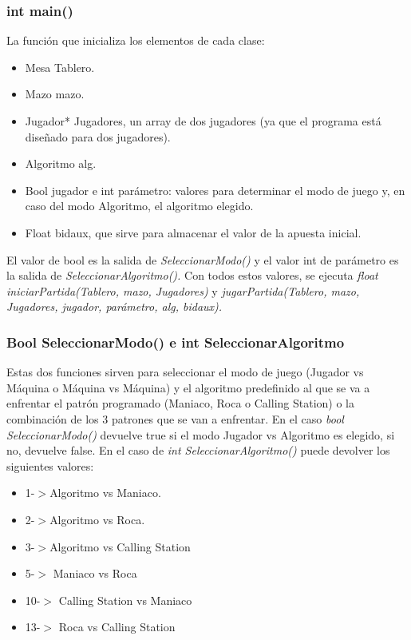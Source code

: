 \subsubsection{int main()}

La función que inicializa los elementos de cada clase:
\begin{itemize}
\item Mesa Tablero.
\item Mazo mazo.
\item Jugador* Jugadores, un array de dos jugadores (ya que el programa está diseñado para dos jugadores).
\item Algoritmo alg.
\item Bool jugador e int parámetro: valores para determinar el modo de juego y, en caso del modo Algoritmo, el algoritmo elegido.
\item Float bidaux, que sirve para almacenar el valor de la apuesta inicial.
 \end{itemize}
El valor de bool es la salida de \textit{SeleccionarModo()} y el valor int de parámetro es la salida de \textit{SeleccionarAlgoritmo().}
Con todos estos valores, se ejecuta \textit{float iniciarPartida(Tablero, mazo, Jugadores)} y \textit{jugarPartida(Tablero, mazo, Jugadores, jugador, parámetro, alg, bidaux).}

\subsubsection{Bool SeleccionarModo() e int SeleccionarAlgoritmo}
Estas dos funciones sirven para seleccionar el modo de juego (Jugador vs Máquina o Máquina vs Máquina) y el algoritmo predefinido al que se va a enfrentar el patrón programado (Maniaco, Roca o Calling Station) o la combinación de los 3 patrones que se van a enfrentar.
En el caso \textit{bool SeleccionarModo()} devuelve true si el modo Jugador vs Algoritmo es elegido, si no, devuelve false.
En el caso de \textit{int SeleccionarAlgoritmo()} puede devolver los siguientes valores:
\begin{itemize}
\item 1-$>$Algoritmo vs Maniaco.
\item 2-$>$Algoritmo vs Roca.
\item 3-$> $Algoritmo vs Calling Station
\item 5-$>$ Maniaco vs Roca
\item 10-$>$ Calling Station vs Maniaco
\item 13-$>$ Roca vs Calling Station
 \end{itemize}

